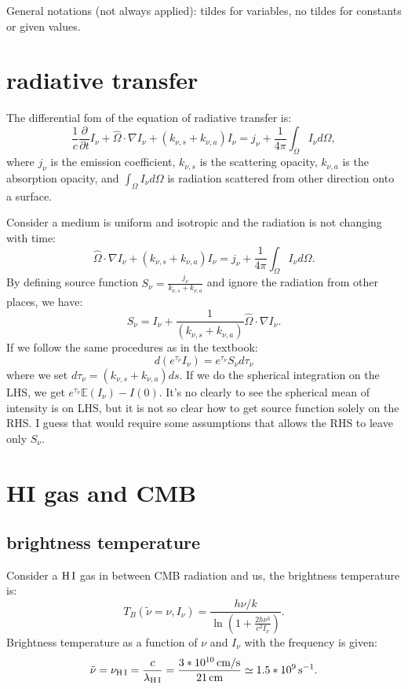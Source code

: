 \documentclass[12pt,letterpaper]{article}
\newcommand{\hi}{\textrm{H\,I}}
\newcommand{\cm}{\textrm{\,cm}}
\newcommand{\cms}{\textrm{\,cm/s}}
\newcommand{\hz}{\textrm{\,s}^{-1}}
\begin{document}
General notations (not always applied):
tildes for variables, no tildes for constants or given values.

\section{radiative transfer}
The differential fom of the equation of radiative transfer is:
\begin{equation}
    \frac{1}{c} \frac{\partial}{\partial t}I_\nu 
    + \hat \Omega \cdot \nabla I_\nu
    + (k_{\nu, s} + k_{\nu, a}) I_\nu 
    = j_\nu + \frac{1}{4\pi} \int_{\Omega} I_{\nu} d\Omega,
\end{equation}
where $j_\nu$ is the emission coefficient, $k_{\nu,s}$  is the scattering opacity, 
$k_{\nu, a}$ is the absorption opacity, and 
$\int_{\Omega} I_{\nu} d\Omega$ is radiation scattered from other direction onto a surface. 

Consider a medium is uniform and isotropic and the radiation is not changing with time:
\begin{equation*}
    \hat \Omega \cdot \nabla I_\nu +   (k_{\nu, s} + k_{\nu, a}) I_\nu 
    = j_\nu + \frac{1}{4\pi} \int_{\Omega} I_{\nu} d\Omega.
\end{equation*} 
By defining source function $S_{\nu} = \frac{j_\nu}{k_{\nu,s} + k_{\nu,a}}$ and ignore the radiation from other places, we have:
\begin{equation*}
    S_\nu 
    = I_\nu + \frac{1}{(k_{\nu, s} + k_{\nu, a})} \hat \Omega \cdot \nabla I_\nu.
\end{equation*} 
If we follow the same procedures as in the textbook:
\begin{equation*}
    d(e^{\tau_\nu} I_{\nu}) = e^{\tau_\nu} S_\nu d\tau_\nu
\end{equation*}
where we set $d\tau_\nu = (k_{\nu, s} + k_{\nu, a}) ds$.
If we do the spherical integration on the LHS, we get $e^{\tau_\nu} \mathbb{E}(I_{\nu}) - I(0)$.
It's no clearly to see the spherical mean of intensity is on LHS, but it is not so clear how to get source function solely on the RHS.
I guess that would require some assumptions that allows the RHS to leave only $S_\nu$.

\section{HI gas and CMB}

\subsection{brightness temperature}
Consider a $\hi$ gas in between CMB radiation and us, the brightness temperature is:
\begin{equation}
    T_B (\tilde \nu=\nu, I_\nu) = \frac{h \nu / k}{\ln{ ( 1 + \frac{2 h \nu^3}{c^2 I_\nu} )  }}.
\end{equation}
Brightness temperature as a function of $\nu$ and $I_\nu$ with the frequency is given:
\begin{equation*}
    \tilde \nu = \nu_{\hi} = \frac{c}{\lambda_{\hi}} = \frac{3 * 10^{10} \cms}{ 21\cm } \simeq 1.5 * 10^{9} \hz.
\end{equation*}
\end{document}
